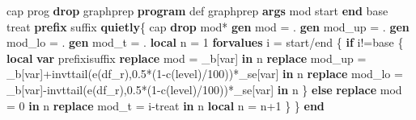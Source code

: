 \documentclass[
  letterpaper,
  DIV=11,
  numbers=noendperiod]{scrartcl}
\newenvironment{Shaded}{\begin{snugshade}}{\end{snugshade}}
\newcommand{\BaseNTok}[1]{\textcolor[rgb]{0.68,0.00,0.00}{#1}}
\newcommand{\DecValTok}[1]{\textcolor[rgb]{0.68,0.00,0.00}{#1}}
\newcommand{\FunctionTok}[1]{\textcolor[rgb]{0.28,0.35,0.67}{#1}}
\newcommand{\KeywordTok}[1]{\textcolor[rgb]{0.00,0.23,0.31}{\textbf{#1}}}
\newcommand{\NormalTok}[1]{\textcolor[rgb]{0.00,0.23,0.31}{#1}}
\newcommand{\OtherTok}[1]{\textcolor[rgb]{0.00,0.23,0.31}{#1}}
\begin{document}
\begin{Shaded}
\begin{Highlighting}[]
\NormalTok{cap prog }\KeywordTok{drop}\NormalTok{ graphprep}
\KeywordTok{program}\NormalTok{ def graphprep}
\KeywordTok{args} \FunctionTok{mod} \BaseNTok{start} \KeywordTok{end}\NormalTok{ base treat }\KeywordTok{prefix}\NormalTok{ suffix}
    \KeywordTok{quietly}\NormalTok{\{}
\NormalTok{        cap }\KeywordTok{drop} \OtherTok{\textasciigrave{}mod\textquotesingle{}}\NormalTok{*}
        \KeywordTok{gen} \OtherTok{\textasciigrave{}mod\textquotesingle{}}\NormalTok{ = .}
        \KeywordTok{gen} \OtherTok{\textasciigrave{}mod\textquotesingle{}}\NormalTok{\_up = .}
        \KeywordTok{gen} \OtherTok{\textasciigrave{}mod\textquotesingle{}}\NormalTok{\_lo = .}
        \KeywordTok{gen} \OtherTok{\textasciigrave{}mod\textquotesingle{}}\NormalTok{\_t = .}
        \KeywordTok{local}\NormalTok{ n = 1}
        \KeywordTok{forvalues}\NormalTok{ i = }\OtherTok{\textasciigrave{}start\textquotesingle{}}\NormalTok{/}\OtherTok{\textasciigrave{}end\textquotesingle{}}\NormalTok{ \{}
            \KeywordTok{if} \OtherTok{\textasciigrave{}i\textquotesingle{}}\NormalTok{!=}\OtherTok{\textasciigrave{}base\textquotesingle{}}\NormalTok{ \{}
            \KeywordTok{local} \KeywordTok{var} \OtherTok{\textasciigrave{}prefix\textquotesingle{}\textasciigrave{}i\textquotesingle{}\textasciigrave{}suffix\textquotesingle{}}
            \KeywordTok{replace} \OtherTok{\textasciigrave{}mod\textquotesingle{}}\NormalTok{ = \_b[}\OtherTok{\textasciigrave{}var\textquotesingle{}}\NormalTok{] }\KeywordTok{in} \OtherTok{\textasciigrave{}n\textquotesingle{}}
            \KeywordTok{replace} \OtherTok{\textasciigrave{}mod\textquotesingle{}}\NormalTok{\_up = \_b[}\OtherTok{\textasciigrave{}var\textquotesingle{}}\NormalTok{]+}\FunctionTok{invttail}\NormalTok{(}\FunctionTok{e}\NormalTok{(df\_r),0.5*(1{-}c(}\DecValTok{level}\NormalTok{)/100))*\_se[}\OtherTok{\textasciigrave{}var\textquotesingle{}}\NormalTok{] }\KeywordTok{in} \OtherTok{\textasciigrave{}n\textquotesingle{}}
            \KeywordTok{replace} \OtherTok{\textasciigrave{}mod\textquotesingle{}}\NormalTok{\_lo = \_b[}\OtherTok{\textasciigrave{}var\textquotesingle{}}\NormalTok{]{-}}\FunctionTok{invttail}\NormalTok{(}\FunctionTok{e}\NormalTok{(df\_r),0.5*(1{-}c(}\DecValTok{level}\NormalTok{)/100))*\_se[}\OtherTok{\textasciigrave{}var\textquotesingle{}}\NormalTok{] }\KeywordTok{in} \OtherTok{\textasciigrave{}n\textquotesingle{}}
\NormalTok{            \}}
            \KeywordTok{else} \KeywordTok{replace} \OtherTok{\textasciigrave{}mod\textquotesingle{}}\NormalTok{ = 0 }\KeywordTok{in} \OtherTok{\textasciigrave{}n\textquotesingle{}}
            \KeywordTok{replace} \OtherTok{\textasciigrave{}mod\textquotesingle{}}\NormalTok{\_t = }\OtherTok{\textasciigrave{}i\textquotesingle{}}\NormalTok{{-}}\OtherTok{\textasciigrave{}treat\textquotesingle{}} \KeywordTok{in} \OtherTok{\textasciigrave{}n\textquotesingle{}}
            \KeywordTok{local}\NormalTok{ n = }\OtherTok{\textasciigrave{}n\textquotesingle{}}\NormalTok{+1}
\NormalTok{        \}}
\NormalTok{    \}}
\KeywordTok{end}


\end{Highlighting}
\end{Shaded}
\end{document}

